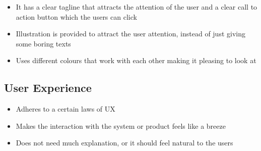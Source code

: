 \documentclass[12pt,titlepage]{article}
\begin{document}
\begin{itemize}
{\begin{figure}[h]
        \end{figure}
        \begin{itemize}
            \item It has a clear tagline that attracts the attention of the user and a clear call to action button which the users can click
            \item Illustration is provided to attract the user attention, instead of just giving some boring texts
            \item Uses different colours that work with each other making it pleasing to look at
        \end{itemize}
    }
\end{itemize}

\pagebreak

\subsection{User Experience}
\begin{itemize}
    \item Adheres to a certain laws of UX
    \item Makes the interaction with the system or product feels like a breeze
    \item Does not need much explanation, or it should feel natural to the users
\end{itemize}
\end{document}

